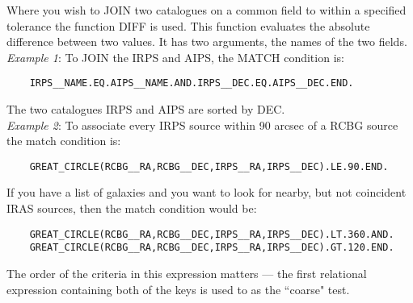 \begin{description}
\begin{itemize}
Where you wish to JOIN two catalogues on a common field to within a specified
tolerance the function DIFF is used.
This function evaluates the absolute difference between two values.
It has two arguments, the names of the two fields.\\
{\em Example 1}: To JOIN the IRPS and AIPS, the MATCH condition is:
\begin{verbatim}
    IRPS__NAME.EQ.AIPS__NAME.AND.IRPS__DEC.EQ.AIPS__DEC.END.
\end{verbatim}
  The two catalogues IRPS and  AIPS  are  sorted  by  DEC.\\
{\em Example 2}: To associate every IRPS source within 90 arcsec of a RCBG
source the match condition is:
\begin{verbatim}
    GREAT_CIRCLE(RCBG__RA,RCBG__DEC,IRPS__RA,IRPS__DEC).LE.90.END.
\end{verbatim}
If you have a list of galaxies and you want to look for nearby, but
not coincident IRAS sources, then the match condition would be:
\begin{verbatim}
    GREAT_CIRCLE(RCBG__RA,RCBG__DEC,IRPS__RA,IRPS__DEC).LT.360.AND.
    GREAT_CIRCLE(RCBG__RA,RCBG__DEC,IRPS__RA,IRPS__DEC).GT.120.END.
\end{verbatim}
The order of the criteria in this expression matters --- the first
relational expression containing both of the keys is used to as the
``coarse" test.


\end{itemize}
\end{description}
